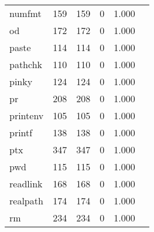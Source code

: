 \begin{longtable}{lp{2.4cm}p{2.4cm}p{2.4cm}p{2.4cm}p{2.4cm}}
numfmt    &                                    159 &                             159 &                                0 &                                       1.000 \\
od        &                                    172 &                             172 &                                0 &                                       1.000 \\
paste     &                                    114 &                             114 &                                0 &                                       1.000 \\
pathchk   &                                    110 &                             110 &                                0 &                                       1.000 \\
pinky     &                                    124 &                             124 &                                0 &                                       1.000 \\
pr        &                                    208 &                             208 &                                0 &                                       1.000 \\
printenv  &                                    105 &                             105 &                                0 &                                       1.000 \\
printf    &                                    138 &                             138 &                                0 &                                       1.000 \\
ptx       &                                    347 &                             347 &                                0 &                                       1.000 \\
pwd       &                                    115 &                             115 &                                0 &                                       1.000 \\
readlink  &                                    168 &                             168 &                                0 &                                       1.000 \\
realpath  &                                    174 &                             174 &                                0 &                                       1.000 \\
rm        &                                    234 &                             234 &                                0 &                                       1.000 \\

\end{longtable}
